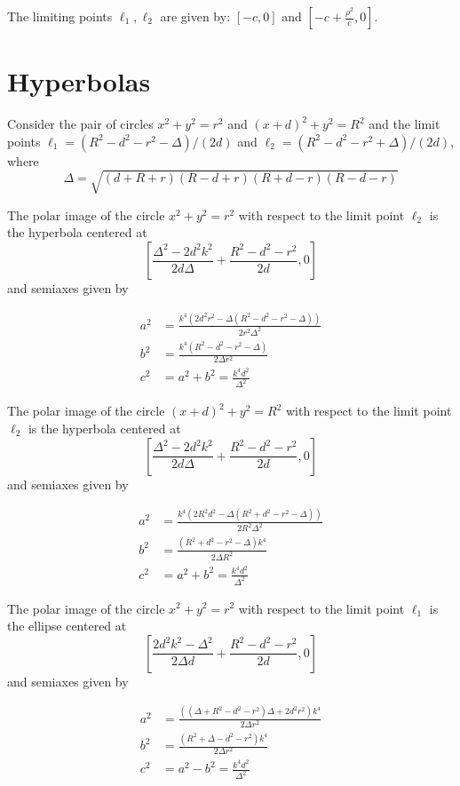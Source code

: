 The limiting points $\ell_1,\ell_2$ are given by: $[-c,0]$ and $[-c+\frac{\rho^2}{c},0]$.
 
 
 \section{ Hyperbolas}
 
 Consider the pair of circles $x^2+y^2=r^2$
 and $(x+d)^2+y^2=R^2$ and the limit points
 $\ell_1= (R^2 - d^2 - r^2 -\Delta)/(2d)$ and $\ell_2=(R^2 - d^2 - r^2 + \Delta)/(2 d)$,
where
 \[ \Delta=\sqrt { \left( d+R+r \right)  \left( R-d+r \right)  \left( R+d-r
 \right)  \left( R-d-r \right) }\]

 \begin{lemma} The polar image of the circle $x^2+y^2=r^2$ with respect to the limit point $  \ell_2 $ is the hyperbola  centered at
 \[ \left[\frac{\Delta^2-2d^2k^2  }{2 d \Delta} + \frac{R^2 - d^2 - r^2}{ 2 d },0\right] \]
 and semiaxes given by
 
 \begin{align*}
     a^2&=\frac{k^4(   2d^2r^2-\Delta(R^2 - d^2 - r^2 - \Delta))}{2 r^2 \Delta^2}\\
     b^2&= \frac{k^4(R^2 - d^2 - r^2 - \Delta)}{2 \Delta r^2  } \\
     c^2&=a^2+b^2=\frac{k^4d^2}{\Delta^2}
 \end{align*}
 \end{lemma}
 
 
 \begin{lemma} The polar image of the circle $(x+d)^2+y^2=R^2$ with respect to the limit point $  \ell_2 $ is the hyperbola  centered at
 \[ \left[\frac{\Delta^2-2d^2k^2  }{2 d \Delta} + \frac{R^2 - d^2 - r^2}{ 2 d },0\right] \]
 and semiaxes given by
 
 \begin{align*}
     a^2&= \frac{k^4(2R^2d^2 - \Delta (R^2 + d^2 - r^2 - \Delta))}{ 2R^2 \Delta^2} \\
     b^2&=  \frac{(R^2+  d^2 - r^2 - \Delta)k^4}{ 2 \Delta R^2} \\
     c^2&=a^2+b^2=\frac{k^4d^2}{\Delta^2}
 \end{align*}
 \end{lemma}


\begin{lemma} The polar image of the circle $x^2+y^2=r^2$ with respect to the limit point $  \ell_1 $ is the ellipse  centered at
 \[ \left[ \frac{ 2 d^2 k^2 - \Delta^2}{ 2 \Delta d} + \frac{R^2 - d^2 - r^2}{ 2 d},0\right] \]
 and semiaxes given by
 
 \begin{align*}
     a^2&=\frac{( (\Delta + R^2 - d^2 - r^2)\Delta + 2d^2r^2)k^4}{ 2 \Delta r^2} \\
     b^2&=\frac{    (R^2+ \Delta-d^2 - r^2 ) k^4}{2 \Delta r^2} \\
     c^2&=a^2-b^2=\frac{k^4d^2}{\Delta^2}
 \end{align*}
 \end{lemma}
 
